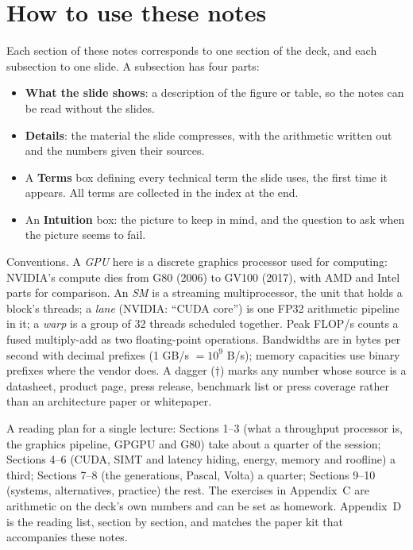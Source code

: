 \documentclass[11pt,letterpaper]{article}
\newcommand{\setstage}[1]{\colorlet{stagec}{#1}}
\begin{document}
\tableofcontents
\clearpage

\section*{How to use these notes}
Each section of these notes corresponds to one section of the deck, and each subsection to one slide. A subsection has four parts:
\begin{itemize}
  \item \textbf{What the slide shows}: a description of the figure or table, so the notes can be read without the slides.
  \item \textbf{Details}: the material the slide compresses, with the arithmetic written out and the numbers given their sources.
  \item A \textbf{Terms} box defining every technical term the slide uses, the first time it appears. All terms are collected in the index at the end.
  \item An \textbf{Intuition} box: the picture to keep in mind, and the question to ask when the picture seems to fail.
\end{itemize}
Conventions. A \emph{GPU} here is a discrete graphics processor used for computing: NVIDIA's compute dies from G80 (2006) to GV100 (2017), with AMD and Intel parts for comparison. An \emph{SM} is a streaming multiprocessor, the unit that holds a block's threads; a \emph{lane} (NVIDIA: ``CUDA core'') is one FP32 arithmetic pipeline in it; a \emph{warp} is a group of 32 threads scheduled together. Peak FLOP/s counts a fused multiply-add as two floating-point operations. Bandwidths are in bytes per second with decimal prefixes (1 GB/s $=10^9$ B/s); memory capacities use binary prefixes where the vendor does. A dagger ($\dagger$) marks any number whose source is a datasheet, product page, press release, benchmark list or press coverage rather than an architecture paper or whitepaper.

A reading plan for a single lecture: Sections 1--3 (what a throughput processor is, the graphics pipeline, GPGPU and G80) take about a quarter of the session; Sections 4--6 (CUDA, SIMT and latency hiding, energy, memory and roofline) a third; Sections 7--8 (the generations, Pascal, Volta) a quarter; Sections 9--10 (systems, alternatives, practice) the rest. The exercises in Appendix~C are arithmetic on the deck's own numbers and can be set as homework. Appendix~D is the reading list, section by section, and matches the paper kit that accompanies these notes.
\setstage{ink}
\end{document}
